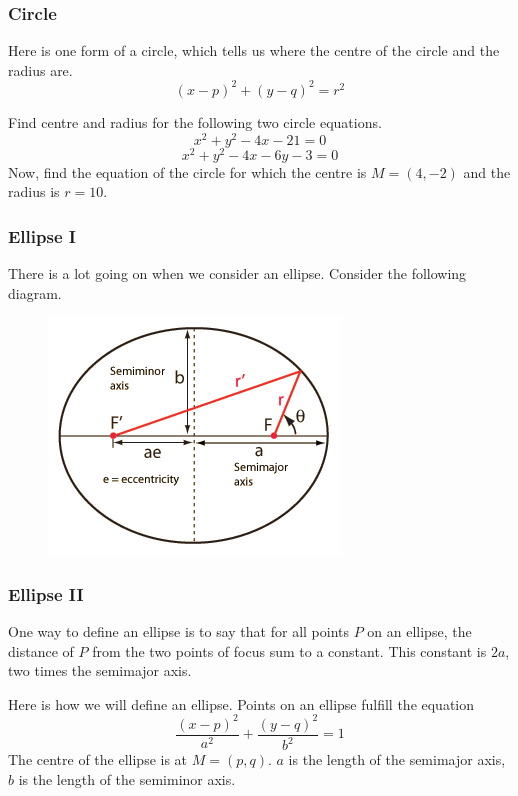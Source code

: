 \documentclass[xcolor=dvipsnames]{beamer}
\begin{document}
\begin{frame}
  \frametitle{Circle}
  Here is one form of a circle, which tells us where the
  \alert{centre} of the circle and the \alert{radius} are.
\begin{equation}
  \label{eq:ainguxuf}
(x-p)^{2}+(y-q)^{2}=r^{2}
\end{equation}

Find centre and radius for the following two circle
equations. 
\begin{equation}
  \label{eq:kahdaixi}
x^{2}+y^{2}-4x-21=0
\end{equation}
\begin{equation}
  \label{eq:adeongie}
x^{2}+y^{2}-4x-6y-3=0
\end{equation}
Now, find the equation of the circle for which the centre is $M=(4,-2)$
and the radius is $r=10$.
\end{frame}

\begin{frame}
  \frametitle{Ellipse I}
There is a lot going on when we consider an ellipse. Consider the
following diagram.
  \begin{figure}[h]
    \includegraphics[scale=.65]{./elliporb.png}
  \end{figure}
\end{frame}

\begin{frame}
  \frametitle{Ellipse II}
  One way to define an ellipse is to say that for all points $P$ on an
  ellipse, the distance of $P$ from the two points of \alert{focus}
  sum to a constant. This constant is $2a$, two times the
  \alert{semimajor axis}.

Here is how we will define an ellipse. Points on an ellipse fulfill
the equation
\begin{equation}
  \label{eq:aiyohboo}
  \frac{(x-p)^{2}}{a^{2}}+\frac{(y-q)^{2}}{b^{2}}=1
\end{equation}
The \alert{centre of the ellipse} is at $M=(p,q)$. $a$ is the length
of the semimajor axis, $b$ is the length of the \alert{semiminor
  axis}.
\end{frame}
\end{document}
